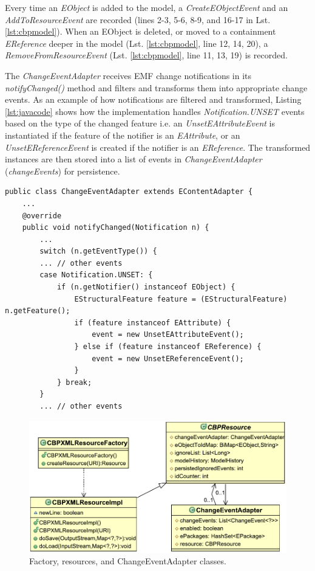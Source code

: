 \documentclass[12pt, a4paper]{report} \usepackage[titletoc]{appendix}
\begin{document}
Every time an \emph{EObject} is added to the model, a \emph{CreateEObjectEvent} and an \emph{AddToResourceEvent} are recorded (lines 2-3, 5-6, 8-9, and 16-17 in Lst. \ref{lst:cbpmodel}). When an EObject is deleted, or moved to a containment \emph{EReference} deeper in the model (Lst. \ref{lst:cbpmodel}, line 12, 14, 20), a \emph{RemoveFromResourceEvent} (Lst. \ref{lst:cbpmodel}, line 11, 13, 19) is recorded.

The \emph{ChangeEventAdapter} receives EMF change notifications in its \emph{notifyChanged()} method and filters and transforms them into appropriate change events. As an example of how notifications are filtered and transformed, Listing \ref{lst:javacode} shows how the implementation handles \emph{Notification.UNSET} events based on the type of the changed feature i.e. an \emph{UnsetEAttributeEvent} is instantiated if the feature of the notifier is an \emph{EAttribute}, or an \emph{UnsetEReferenceEvent}  is created if the notifier is an \emph{EReference}. The transformed instances are then stored into a list of events in \emph{ChangeEventAdapter} (\emph{changeEvents}) for persistence. 

\begin{lstlisting}[style=java,caption={Simplified Java code to handle notification events.},label=lst:javacode]
public class ChangeEventAdapter extends EContentAdapter {
    ...
    @override
    public void notifyChanged(Notification n) {
        ...
        switch (n.getEventType()) {
        ... // other events
        case Notification.UNSET: {
            if (n.getNotifier() instanceof EObject) {
                EStructuralFeature feature = (EStructuralFeature) n.getFeature();
                if (feature instanceof EAttribute) {
                    event = new UnsetEAttributeEvent();
                } else if (feature instanceof EReference) {
                    event = new UnsetEReferenceEvent();
                }
            } break;
        } 
        ... // other events
\end{lstlisting}

\begin{figure}[th]
	\centering
	\includegraphics[width=0.6\linewidth]{resources}
	\caption{Factory, resources, and ChangeEventAdapter classes.}
	\label{fig:resources}
\end{figure}
\end{document}
